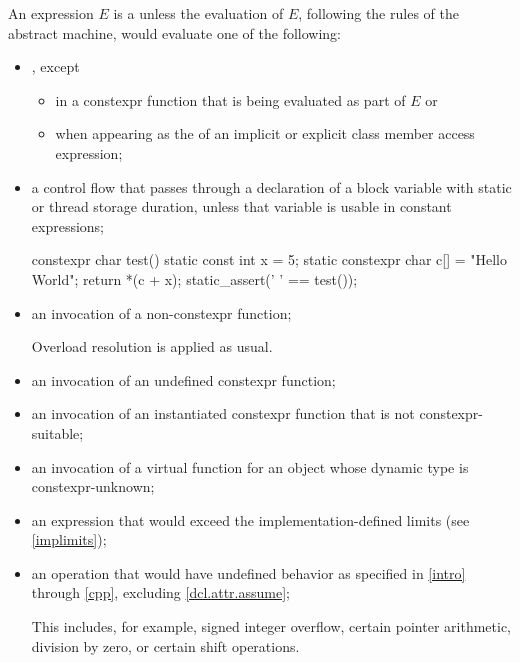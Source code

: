 \pnum
An expression $E$ is a 
unless the evaluation of $E$, following the rules of the abstract
machine, would evaluate one of the following:
\begin{itemize}
\item
{}, except
\begin{itemize}
\item
in a constexpr function
that is being evaluated as part of $E$ or
\item
when appearing as the  of
an implicit or explicit class member access expression;
\end{itemize}

\item
a control flow that passes through
a declaration of a block variable with
static or
thread storage duration,
unless that variable is usable in constant expressions;
\begin{example}
\begin{codeblock}
constexpr char test() {
  static const int x = 5;
  static constexpr char c[] = "Hello World";
  return *(c + x);
}
static_assert(' ' == test());
\end{codeblock}
\end{example}

\item
an invocation of a non-constexpr function;
\begin{footnote}
Overload resolution
is applied as usual.
\end{footnote}

\item
an invocation of an undefined constexpr function;

\item
an invocation of an instantiated constexpr function
that is not constexpr-suitable;

\item
an invocation of a virtual function
for an object whose dynamic type is constexpr-unknown;

\item
an expression that would exceed the implementation-defined
limits (see \ref{implimits});

\item
an operation that would have undefined behavior
as specified in \ref{intro} through \ref{cpp},
excluding \ref{dcl.attr.assume};
\begin{footnote}
This includes,
for example, signed integer overflow, certain
pointer arithmetic, division by
zero, or certain shift operations.
\end{footnote}


\end{itemize}
